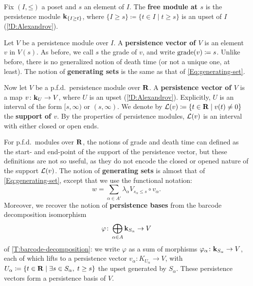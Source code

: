 \begin{definition}
\label{!D:free}
\label{!D:generalized-persistence-vector}
  Fix $(I, \mathord{\leq})$ a poset and $s$ an element of $I$. The \textbf{free module at $s$} is the persistence module $\mathbf{k}_{\{I \geq t\}}$, where $\{I \geq s\} \coloneq \{t \in I \mid t \geq s\}$ is an upset of $I$ (\cref{!D:Alexandrov}).
  
  Let $V$ be a persistence module over $I$. A \textbf{persistence vector of $V$} is an element $v$ in $V(s)$. As before, we call $s$ the grade of $v$, and write $\operatorname{grade}(v) \coloneq s$. Unlike before, there is no generalized notion of death time (or not a unique one, at least). The notion of \textbf{generating sets} is the same as that of \eqref{Eq:generating-set}.
  
  Now let $V$ be a p.f.d.\ persistence module over $\mathbf{R}$. A \textbf{persistence vector of $V$} is a map $v \colon \mathbf{k}_{U} \to V$, where $U$ is an upset (\cref{!D:Alexandrov}). Explicitly, $U$ is an interval of the form $[s, \infty)$ or $(s, \infty)$. We denote by $\mathcal{L}(v) \coloneq \{t \in \mathbf{R} \mid v(t) \neq 0\}$ the \textbf{support of $v$}. By the properties of persistence modules, $\mathcal{L}(v)$ is an interval with either closed or open ends.
  
  For p.f.d.\ modules over $\mathbf{R}$, the notions of grade and death time can defined as the start- and end-point of the support of the persistence vector, but these definitions are not so useful, as they do not encode the closed or opened nature of the support $\mathcal{L}(v)$. The notion of \textbf{generating sets} is almost that of \eqref{Eq:generating-set}, except that we use the functional notation:
  \[
    w = \sum_{\alpha \in A'} \lambda_\alpha V_{s_\alpha \leq s} \circ v_\alpha.
  \]
  Moreover, we recover the notion of \textbf{persistence bases} from the barcode decomposition isomorphism
  \[
    \varphi \colon \bigoplus_{\alpha \in A} \mathbf{k}_{S_\alpha} \to V
  \]
  of \cref{T:barcode-decomposition}: we write $\varphi$ as a sum of morphisms $\varphi_\alpha \colon \mathbf{k}_{S_\alpha} \to V$, each of which lifts to a persistence vector $v_\alpha \colon K_{U_\alpha} \to V$, with $U_\alpha \coloneq \{t \in \mathbf{R} \mid \exists s \in S_\alpha, \; t \geq s\}$ the upset generated by $S_\alpha$. These persistence vectors form a persistence basis of $V$.
\end{definition}

